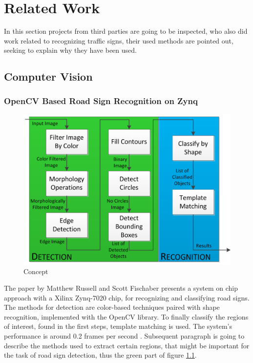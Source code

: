 
\chapter{Related Work}\label{chapter:Related Work}
In this section projects from third parties are going to be inspected, who also did work related to recognizing traffic signs, their used methods are pointed out, seeking to explain why they have been used.

\section{Computer Vision}
\subsection{OpenCV Based Road Sign Recognition on Zynq}
\begin{figure}[H]
	\centering
	\includegraphics[width=\linewidth]{images/zynqconcept.png}
	\caption{Concept \cite{zynq}}\label{fig:zynq}
	\endminipage\hfill
\end{figure}
The paper by Matthew Russell and Scott Fischaber presents a system on chip approach with a Xilinx Zynq-7020 chip, for recognizing and classifying road signs. The methods for detection are color-based techniques paired with shape recognition, implemented with the OpenCV library. To finally classify the regions of interest, found in the first steps, template matching is used. The system's performance is around 0.2 frames per second \cite{zynq}. Subsequent paragraph is going to describe the methods used to extract certain regions, that might be important for the task of road sign detection, thus the green part of figure \ref{fig:zynq}. \newline
